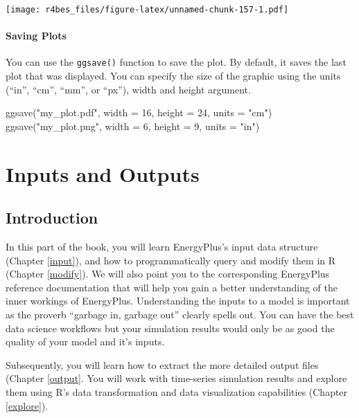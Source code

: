 \documentclass[
]{book}
\newenvironment{Shaded}{\begin{snugshade}}{\end{snugshade}}
\newcommand{\AttributeTok}[1]{\textcolor[rgb]{0.77,0.63,0.00}{#1}}
\newcommand{\DecValTok}[1]{\textcolor[rgb]{0.00,0.00,0.81}{#1}}
\newcommand{\FunctionTok}[1]{\textcolor[rgb]{0.00,0.00,0.00}{#1}}
\newcommand{\NormalTok}[1]{#1}
\newcommand{\StringTok}[1]{\textcolor[rgb]{0.31,0.60,0.02}{#1}}
\begin{document}
\texttt{[image: r4bes\_files/figure-latex/unnamed-chunk-157-1.pdf]}

\hypertarget{saving-plots}{%
\subsection{Saving Plots}\label{saving-plots}}

You can use the \texttt{ggsave()} function to save the plot. By default, it saves the last plot that was displayed. You can specify the size of the graphic using the units (``in'', ``cm'', ``mm'', or ``px''), width and height argument.

\begin{Shaded}
\begin{Highlighting}[]
\FunctionTok{ggsave}\NormalTok{(}\StringTok{"my\_plot.pdf"}\NormalTok{, }\AttributeTok{width =} \DecValTok{16}\NormalTok{, }\AttributeTok{height =} \DecValTok{24}\NormalTok{, }\AttributeTok{units =} \StringTok{"cm"}\NormalTok{)}
\FunctionTok{ggsave}\NormalTok{(}\StringTok{"my\_plot.png"}\NormalTok{, }\AttributeTok{width =} \DecValTok{6}\NormalTok{, }\AttributeTok{height =} \DecValTok{9}\NormalTok{, }\AttributeTok{units =} \StringTok{"in"}\NormalTok{)}
\end{Highlighting}
\end{Shaded}

\hypertarget{part-inputs-and-outputs}{%
\part{Inputs and Outputs}\label{part-inputs-and-outputs}}

\hypertarget{input-output}{%
\chapter{Introduction}\label{input-output}}

In this part of the book, you will learn EnergyPlus's input data structure (Chapter \ref{input}), and how to programmatically query and modify them in R (Chapter \ref{modify}). We will also point you to the corresponding EnergyPlus reference documentation that will help you gain a better understanding of the inner workings of EnergyPlus. Understanding the inputs to a model is important as the proverb ``garbage in, garbage out'' clearly spells out. You can have the best data science workflows but your simulation results would only be as good the quality of your model and it's inputs.

Subsequently, you will learn how to extract the more detailed output files (Chapter \ref{output}. You will work with time-series simulation results and explore them using R's data transformation and data visualization capabilities (Chapter \ref{explore}).
\end{document}
